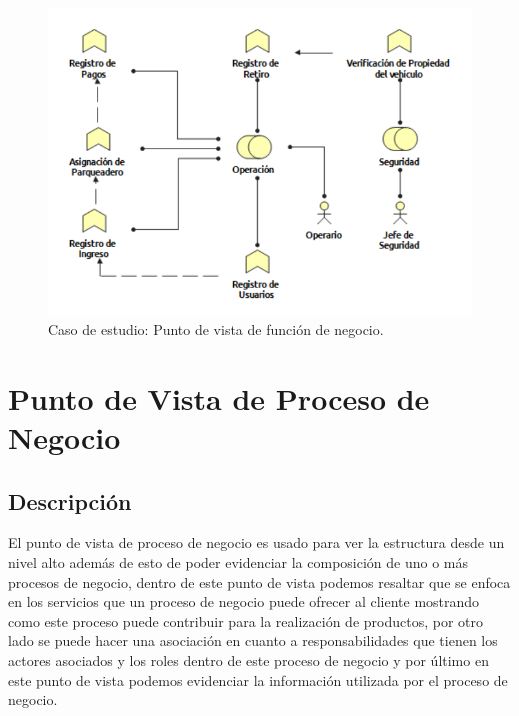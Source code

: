 \begin{figure}[H]
	\centering
	\includegraphics[width=1.0\textwidth]{imagenes/Caso_estudio/Negocio/FunNegocio.PDF}
	\caption{Caso de estudio: Punto de vista de función de negocio.}
	\label{fig:gap_analysis}
\end{figure}








\section{Punto de Vista de Proceso de Negocio}
\subsection{Descripción}
El punto de vista de proceso de negocio es usado para ver la estructura desde un nivel alto además de esto de poder evidenciar la composición de uno o más procesos de negocio, dentro de este punto de vista podemos resaltar que se enfoca en los servicios que un proceso de negocio puede ofrecer al cliente mostrando como este proceso puede contribuir para la realización de productos, por otro lado se puede hacer una asociación en cuanto a responsabilidades que tienen los actores asociados y los roles dentro de este proceso de negocio y por último en este punto de vista podemos evidenciar la información utilizada por el proceso de negocio.

